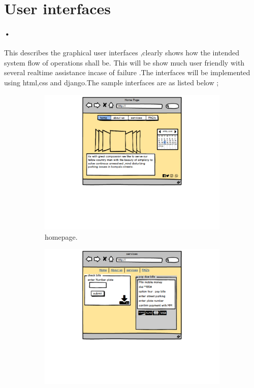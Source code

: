 \documentclass[12pt]{article}
\begin{document}
\section{User interfaces}
\paragraph{•}This describes the graphical user interfaces ,clearly shows how the intended system flow of operations shall be. This will be show much user friendly with several realtime assistance incase of failure .The interfaces will be implemented using html,css and django.The sample interfaces are as listed below ;
\begin{figure}[h!]
  \centering
  \begin{subfigure}[b]{0.4\linewidth}
    \includegraphics[width=\linewidth]{research.pdf}
     \caption{homepage.}
  \end{subfigure}
  \begin{subfigure}[b]{0.4\linewidth}
    \includegraphics[width=\linewidth]{services.pdf}

\end{subfigure}
\end{figure}
\end{document}
